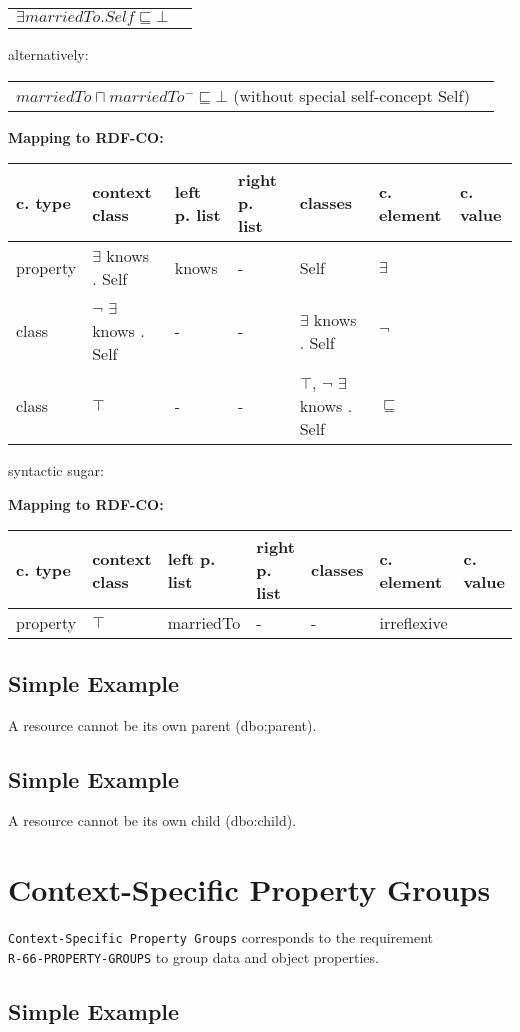 \documentclass{llncs}
\newcommand{\ms}[1]{\texttt{#1}}
\newenvironment{gcotable}{
  \scriptsize
  \sffamily
  \vspace{0cm}
	\begin{center}
	\textbf{\vspace{0.4cm}Mapping to RDF-CO:} \\
  \begin{tabular}{l|l|l|l|l|l|l}
	\hline
  \textbf{c. type} & \textbf{context class} & \textbf{left p. list} & \textbf{right p. list} & \textbf{classes} & \textbf{c. element} & \textbf{c. value} \\
  \hline

}{
  \hline
  \end{tabular}
	\end{center}
}
\newenvironment{DL}{
  \vspace{0cm}
	\begin{center}
  \begin{tabular}{r l}

}{
  \end{tabular}
	\end{center}
}
\begin{document}
\begin{DL}
$\exists marriedTo . Self \sqsubseteq \bot$  
\end{DL}

alternatively:

\begin{DL}
$marriedTo \sqcap marriedTo^{-} \sqsubseteq \bot$ (without special self-concept Self)
\end{DL}

\begin{gcotable}
property & $\exists$ knows . Self & knows & - & Self & $\exists$ \\
class & $\neg$ $\exists$ knows . Self & - & - & $\exists$ knows . Self & $\neg$ \\
class & $\top$ & - & - & $\top$, $\neg$ $\exists$ knows . Self & $\sqsubseteq$ \\
\end{gcotable}

syntactic sugar:

\begin{gcotable}
property & $\top$ & marriedTo & - & - & irreflexive \\
\end{gcotable}

\subsection{Simple Example}

A resource cannot be its own parent (dbo:parent).

\subsection{Simple Example}

A resource cannot be its own child (dbo:child).

\section{Context-Specific Property Groups}

\ms{Context-Specific Property Groups} corresponds to the requirement \\
\ms{R-66-PROPERTY-GROUPS} to group data and object properties.

\subsection{Simple Example}
\end{document}
